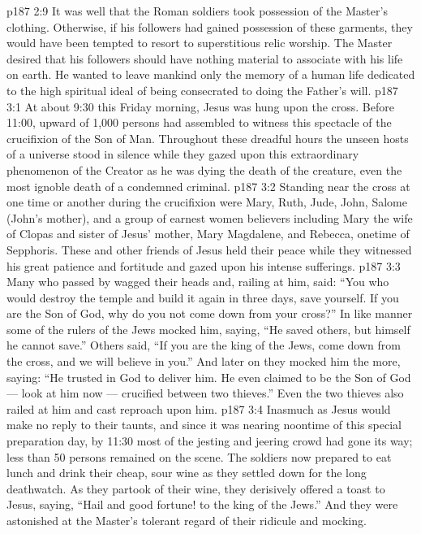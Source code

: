 \vs p187 2:9 \pc It was well that the Roman soldiers took possession of the Master’s clothing. Otherwise, if his followers had gained possession of these garments, they would have been tempted to resort to superstitious relic worship. The Master desired that his followers should have nothing material to associate with his life on earth. He wanted to leave mankind only the memory of a human life dedicated to the high spiritual ideal of being consecrated to doing the Father’s will.
\vs p187 3:1 At about 9:30 this Friday morning, Jesus was hung upon the cross. Before 11:00, upward of 1,000 persons had assembled to witness this spectacle of the crucifixion of the Son of Man. Throughout these dreadful hours the unseen hosts of a universe stood in silence while they gazed upon this extraordinary phenomenon of the Creator as he was dying the death of the creature, even the most ignoble death of a condemned criminal.
\vs p187 3:2 Standing near the cross at one time or another during the crucifixion were Mary, Ruth, Jude, John, Salome (John’s mother), and a group of earnest women believers including Mary the wife of Clopas and sister of Jesus’ mother, Mary Magdalene, and Rebecca, onetime of Sepphoris. These and other friends of Jesus held their peace while they witnessed his great patience and fortitude and gazed upon his intense sufferings.
\vs p187 3:3 Many who passed by wagged their heads and, railing at him, said: “You who would destroy the temple and build it again in three days, save yourself. If you are the Son of God, why do you not come down from your cross?” In like manner some of the rulers of the Jews mocked him, saying, “He saved others, but himself he cannot save.” Others said, “If you are the king of the Jews, come down from the cross, and we will believe in you.” And later on they mocked him the more, saying: “He trusted in God to deliver him. He even claimed to be the Son of God --- look at him now --- crucified between two thieves.” Even the two thieves also railed at him and cast reproach upon him.
\vs p187 3:4 Inasmuch as Jesus would make no reply to their taunts, and since it was nearing noontime of this special preparation day, by 11:30 most of the jesting and jeering crowd had gone its way; less than 50 persons remained on the scene. The soldiers now prepared to eat lunch and drink their cheap, sour wine as they settled down for the long deathwatch. As they partook of their wine, they derisively offered a toast to Jesus, saying, “Hail and good fortune! to the king of the Jews.” And they were astonished at the Master’s tolerant regard of their ridicule and mocking.
